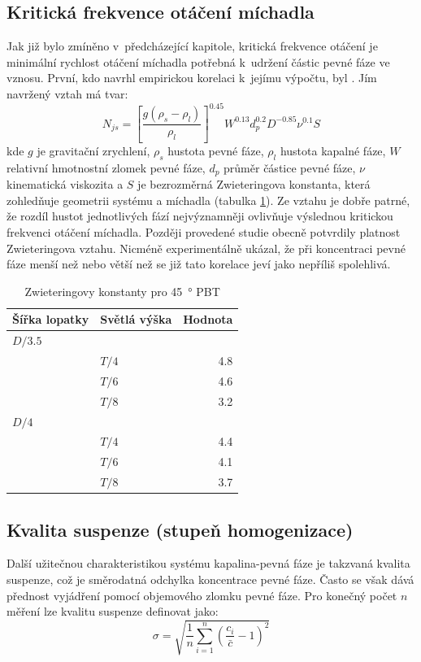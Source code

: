 \subsection{Kritická frekvence otáčení míchadla}
Jak již bylo zmíněno v~předcházející kapitole, kritická frekvence otáčení je minimální rychlost otáčení míchadla potřebná k~udržení částic pevné fáze ve vznosu. První, kdo navrhl empirickou korelaci k~jejímu výpočtu, byl \citet{zwi58}. Jím navržený vztah má tvar:
\begin{equation}
	N_{js} = \left[\frac{g(\rho_{s}-\rho_{l})}{\rho_{l}}\right]^{\num{0.45}}W^{\num{0.13}}d_{p}^{\num{0.2}}D^{\num{-0.85}}\nu^{\num{0.1}}S
	\label{eq:nkrit}
\end{equation} 
kde $g$ je gravitační zrychlení, $\rho_{s}$ hustota pevné fáze, $\rho_{l}$ hustota kapalné fáze, $W$ relativní hmotnostní zlomek pevné fáze, $d_{p}$ průměr částice pevné fáze, $\nu$ kinematická viskozita a $S$ je bezrozměrná Zwieteringova konstanta, která zohledňuje geometrii systému a míchadla (tabulka \ref{tab:S}). Ze vztahu je dobře patrné, že rozdíl hustot jednotlivých fází nejvýznamněji ovlivňuje výslednou kritickou frekvenci otáčení míchadla. Později provedené studie \citep{nie68,bal78,chou97} obecně potvrdily platnost Zwieteringova vztahu. Nicméně \citet{chou97} experimentálně ukázal, že při koncentraci pevné fáze menší než  nebo větší než  se již tato korelace jeví jako nepříliš spolehlivá.

\begin{table}[h!]
\centering
\caption{Zwieteringovy konstanty pro \SI{45}{\degree} PBT}
\label{tab:S}
\begin{tabular}{llr}
\toprule
\textbf{Šířka lopatky} & \textbf{Světlá výška} & \textbf{Hodnota} \\
\midrule

$D/\num{3.5}$ \\
& $T/4$ & \num{4.8} \\
& $T/6$ & \num{4.6} \\
& $T/8$ & \num{3.2} \\
$D/4$ \\
& $T/4$ & \num{4.4} \\
& $T/6$ & \num{4.1} \\
& $T/8$ & \num{3.7} \\

\bottomrule
\end{tabular}
\end{table}

\subsection{Kvalita suspenze (stupeň homogenizace)}
Další užitečnou charakteristikou systému kapalina-pevná fáze je takzvaná kvalita sus\-pen\-ze, což je směrodatná odchylka koncentrace pevné fáze. Často se však dává přednost vyjádření pomocí objemového zlomku pevné fáze. Pro konečný počet $n$ měření lze kvalitu suspenze definovat jako:
\begin{equation}
	\sigma = \sqrt{\frac{1}{n}\sum_{i=1}^{n}\left(\frac{c_{i}}{\bar{c}} - 1\right)^{2}}
	\label{eq:kvasus}
\end{equation}  

